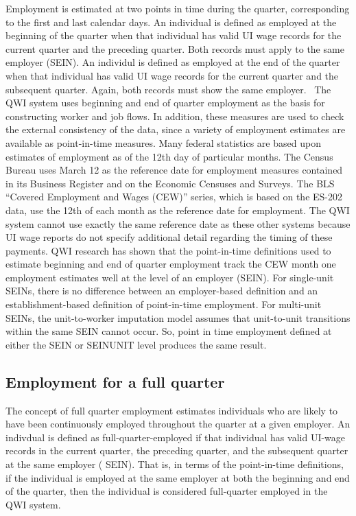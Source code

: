 Employment is estimated at two points in time during the quarter,
corresponding to the first and last calendar days. An individual is defined
as employed at the beginning of the quarter when that individual has valid %
UI wage records for the current quarter and the preceding
quarter.  Both records must apply to the same employer (SEIN).
An individul is defined as employed at the end of the quarter when that
individual has valid {UI} wage records for the current quarter and the
subsequent quarter. Again, both records must show the same employer. \ The
QWI system uses beginning and end of quarter employment as the basis for
constructing worker and job flows. In addition, these measures are used to
check the external consistency of the data, since a variety of employment
estimates are available as point-in-time measures. Many federal statistics
are based upon estimates of employment as of the 12th day of particular
months. The Census Bureau uses March 12 as the reference date for
employment measures contained in its Business Register and on the Economic
Censuses and Surveys.  The BLS ``Covered Employment and Wages
(CEW)'' series, which is based on the ES-202
data, use the 12th of each month as the reference date for employment. The
QWI system cannot use exactly the same reference date as these other
systems because {UI} wage reports do not specify additional detail
regarding the timing of these payments. QWI research has shown that the
point-in-time definitions used to estimate beginning and end of quarter
employment track the CEW month one employment estimates well at the level
of an employer ({SEIN}). For single-unit SEINs, there is no difference between
an employer-based definition and an establishment-based definition of
point-in-time employment. For multi-unit SEINs, the unit-to-worker imputation model assumes that 
unit-to-unit transitions within the same SEIN cannot occur. So, point in 
time employment defined at either the SEIN or SEINUNIT level produces the 
same result.

\subsection{Employment for a full quarter}


The concept of full quarter employment estimates individuals who are likely
to have been continuously employed throughout the quarter at a given
employer. An indivdual is defined as full-quarter-employed if that
individual has valid UI-wage records in the current quarter, the
preceding quarter, and the subsequent quarter at the same employer (%
SEIN). That is, in terms of the point-in-time definitions, if the
individual is employed at the same employer at both the beginning and end of
the quarter, then the individual is considered full-quarter employed in the
QWI system. 

